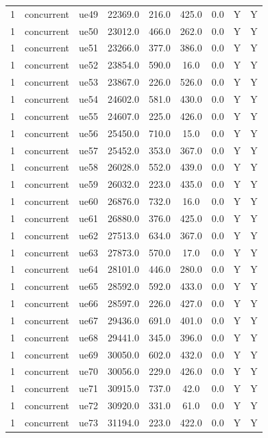 \begin{table}[ht]
\begin{tabular}{|c|c|c|c|c|c|c|c|c|}
1 & concurrent & ue49 & 22369.0 & 216.0 & 425.0 & 0.0 & Y & Y \\
1 & concurrent & ue50 & 23012.0 & 466.0 & 262.0 & 0.0 & Y & Y \\
1 & concurrent & ue51 & 23266.0 & 377.0 & 386.0 & 0.0 & Y & Y \\
1 & concurrent & ue52 & 23854.0 & 590.0 & 16.0 & 0.0 & Y & Y \\
1 & concurrent & ue53 & 23867.0 & 226.0 & 526.0 & 0.0 & Y & Y \\
1 & concurrent & ue54 & 24602.0 & 581.0 & 430.0 & 0.0 & Y & Y \\
1 & concurrent & ue55 & 24607.0 & 225.0 & 426.0 & 0.0 & Y & Y \\
1 & concurrent & ue56 & 25450.0 & 710.0 & 15.0 & 0.0 & Y & Y \\
1 & concurrent & ue57 & 25452.0 & 353.0 & 367.0 & 0.0 & Y & Y \\
1 & concurrent & ue58 & 26028.0 & 552.0 & 439.0 & 0.0 & Y & Y \\
1 & concurrent & ue59 & 26032.0 & 223.0 & 435.0 & 0.0 & Y & Y \\
1 & concurrent & ue60 & 26876.0 & 732.0 & 16.0 & 0.0 & Y & Y \\
1 & concurrent & ue61 & 26880.0 & 376.0 & 425.0 & 0.0 & Y & Y \\
1 & concurrent & ue62 & 27513.0 & 634.0 & 367.0 & 0.0 & Y & Y \\
1 & concurrent & ue63 & 27873.0 & 570.0 & 17.0 & 0.0 & Y & Y \\
1 & concurrent & ue64 & 28101.0 & 446.0 & 280.0 & 0.0 & Y & Y \\
1 & concurrent & ue65 & 28592.0 & 592.0 & 433.0 & 0.0 & Y & Y \\
1 & concurrent & ue66 & 28597.0 & 226.0 & 427.0 & 0.0 & Y & Y \\
1 & concurrent & ue67 & 29436.0 & 691.0 & 401.0 & 0.0 & Y & Y \\
1 & concurrent & ue68 & 29441.0 & 345.0 & 396.0 & 0.0 & Y & Y \\
1 & concurrent & ue69 & 30050.0 & 602.0 & 432.0 & 0.0 & Y & Y \\
1 & concurrent & ue70 & 30056.0 & 229.0 & 426.0 & 0.0 & Y & Y \\
1 & concurrent & ue71 & 30915.0 & 737.0 & 42.0 & 0.0 & Y & Y \\
1 & concurrent & ue72 & 30920.0 & 331.0 & 61.0 & 0.0 & Y & Y \\
1 & concurrent & ue73 & 31194.0 & 223.0 & 422.0 & 0.0 & Y & Y \\

\end{tabular}
\end{table}
